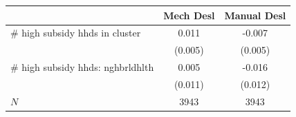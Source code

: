 \begin{tabular}{lcc}
\hline\hline
 & Mech Desl & Manual Desl \\
\hline
# high subsidy hhds in cluster & 0.011 & -0.007 \\
 & (0.005) & (0.005) \\
# high subsidy hhds: nghbrldhlth & 0.005 & -0.016 \\
 & (0.011) & (0.012) \\
\hline
$N$ & 3943 & 3943 \\
\hline\hline
\end{tabular}
